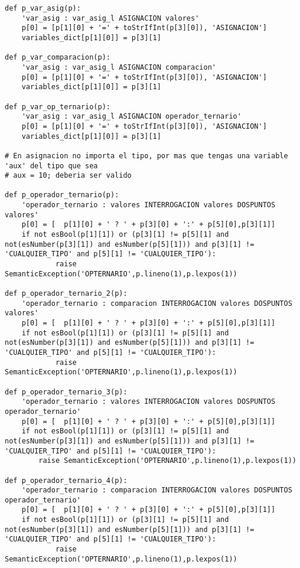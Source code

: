 \begin{verbatim}
def p_var_asig(p):
    'var_asig : var_asig_l ASIGNACION valores'
    p[0] = [p[1][0] + '=' + toStrIfInt(p[3][0]), 'ASIGNACION']
    variables_dict[p[1][0]] = p[3][1]

def p_var_comparacion(p):
    'var_asig : var_asig_l ASIGNACION comparacion'
    p[0] = [p[1][0] + '=' + toStrIfInt(p[3][0]), 'ASIGNACION']
    variables_dict[p[1][0]] = p[3][1]

def p_var_op_ternario(p):
    'var_asig : var_asig_l ASIGNACION operador_ternario'
    p[0] = [p[1][0] + '=' + toStrIfInt(p[3][0]), 'ASIGNACION']
    variables_dict[p[1][0]] = p[3][1]

# En asignacion no importa el tipo, por mas que tengas una variable 'aux' del tipo que sea
# aux = 10; deberia ser valido

def p_operador_ternario(p):
    'operador_ternario : valores INTERROGACION valores DOSPUNTOS valores'
    p[0] = [  p[1][0] + ' ? ' + p[3][0] + ':' + p[5][0],p[3][1]]
    if not esBool(p[1][1]) or (p[3][1] != p[5][1] and not(esNumber(p[3][1]) and esNumber(p[5][1])) and p[3][1] != 'CUALQUIER_TIPO' and p[5][1] != 'CUALQUIER_TIPO'):
            raise SemanticException('OPTERNARIO',p.lineno(1),p.lexpos(1))

def p_operador_ternario_2(p):
    'operador_ternario : comparacion INTERROGACION valores DOSPUNTOS valores'
    p[0] = [  p[1][0] + ' ? ' + p[3][0] + ':' + p[5][0],p[3][1]]
    if not esBool(p[1][1]) or (p[3][1] != p[5][1] and not(esNumber(p[3][1]) and esNumber(p[5][1])) and p[3][1] != 'CUALQUIER_TIPO' and p[5][1] != 'CUALQUIER_TIPO'):
            raise SemanticException('OPTERNARIO',p.lineno(1),p.lexpos(1))

def p_operador_ternario_3(p):
    'operador_ternario : valores INTERROGACION valores DOSPUNTOS operador_ternario'
    p[0] = [  p[1][0] + ' ? ' + p[3][0] + ':' + p[5][0],p[3][1]]
    if not esBool(p[1][1]) or (p[3][1] != p[5][1] and not(esNumber(p[3][1]) and esNumber(p[5][1])) and p[3][1] != 'CUALQUIER_TIPO' and p[5][1] != 'CUALQUIER_TIPO'):
        raise SemanticException('OPTERNARIO',p.lineno(1),p.lexpos(1))

def p_operador_ternario_4(p):
    'operador_ternario : comparacion INTERROGACION valores DOSPUNTOS operador_ternario'                             
    p[0] = [  p[1][0] + ' ? ' + p[3][0] + ':' + p[5][0],p[3][1]]
    if not esBool(p[1][1]) or (p[3][1] != p[5][1] and not(esNumber(p[3][1]) and esNumber(p[5][1])) and p[3][1] != 'CUALQUIER_TIPO' and p[5][1] != 'CUALQUIER_TIPO'):
            raise SemanticException('OPTERNARIO',p.lineno(1),p.lexpos(1))


\end{verbatim}
